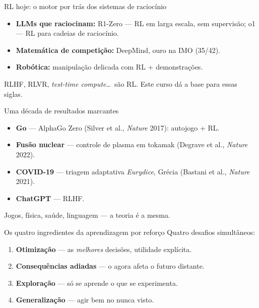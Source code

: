 \documentclass[aspectratio=169, 11pt]{beamer}
\begin{document}
\begin{frame}{RL hoje: o motor por trás dos sistemas de raciocínio}
  \begin{itemize}
    \item \textbf{LLMs que raciocinam:} R1-Zero — RL em larga escala, sem supervisão; o1 — RL para cadeias de raciocínio.
    \item \textbf{Matemática de competição:} DeepMind, ouro na IMO (35/42).
    \item \textbf{Robótica:} manipulação delicada com RL + demonstrações.
  \end{itemize}

  \begin{ideiabox}
    RLHF, RLVR, \emph{test-time compute}\ldots\ são RL. Este curso dá a base para essas siglas.
  \end{ideiabox}
\end{frame}

\begin{frame}{Uma década de resultados marcantes}
  \begin{itemize}
    \item \textbf{Go} — AlphaGo Zero (Silver et al., \emph{Nature} 2017): autojogo + RL.
    \item \textbf{Fusão nuclear} — controle de plasma em tokamak (Degrave et al., \emph{Nature} 2022).
    \item \textbf{COVID-19} — triagem adaptativa \emph{Eurydice}, Grécia (Bastani et al., \emph{Nature} 2021).
    \item \textbf{ChatGPT} — RLHF.
  \end{itemize}

  \medskip
  {\small\color{rlCinza} Jogos, física, saúde, linguagem — a teoria é a mesma.}
\end{frame}

\begin{frame}{Os quatro ingredientes da aprendizagem por reforço}
  Quatro desafios simultâneos:

  \medskip
  \begin{enumerate}
    \item<1-> \textbf{Otimização} — as \emph{melhores} decisões, utilidade explícita.
    \item<2-> \textbf{Consequências adiadas} — o agora afeta o futuro distante.
    \item<3-> \textbf{Exploração} — só se aprende o que se experimenta.
    \item<4-> \textbf{Generalização} — agir bem no nunca visto.
  \end{enumerate}

  \medskip
\end{frame}
\end{document}

